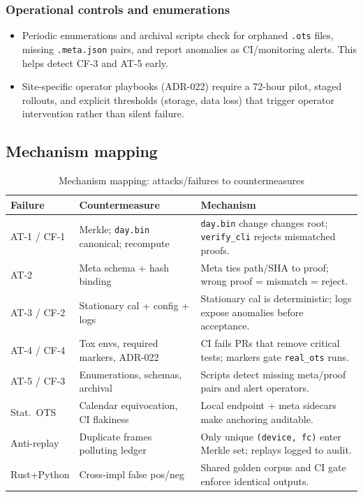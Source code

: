 \subsubsection{Operational controls and enumerations}
\begin{itemize}[nosep]
  \item Periodic enumerations and archival scripts check for orphaned \texttt{.ots} files, missing \texttt{.meta.json} pairs, and report anomalies as \ac{CI}/monitoring alerts.
  This helps detect CF-3 and AT-5 early.
  \item Site-specific operator playbooks (\ac{ADR}-022) require a 72-hour pilot, staged rollouts, and explicit thresholds (storage, data loss) that trigger operator intervention rather than silent failure.
\end{itemize}

\subsection{Mechanism mapping}
\begin{table}[H]
  \centering
  \caption{Mechanism mapping: attacks/failures to countermeasures}
  \begin{tabularx}{\textwidth}{l >{\raggedright\arraybackslash}X >{\raggedright\arraybackslash}X}
    \toprule
    \textbf{Failure} & \textbf{Countermeasure} & \textbf{Mechanism} \\
    \midrule
    AT-1 / CF-1 & Merkle; \texttt{day.bin} canonical; recompute & \texttt{day.bin} change changes root; \texttt{verify\_cli} rejects mismatched proofs. \\
    \addlinespace
    AT-2 & Meta schema + hash binding & Meta ties path/\ac{SHA} to proof; wrong proof = mismatch = reject. \\
    \addlinespace
    AT-3 / CF-2 & Stationary cal + config + logs & Stationary cal is deterministic; logs expose anomalies before acceptance. \\
    \addlinespace
    AT-4 / CF-4 & Tox envs, required markers, \ac{ADR}-022 & \ac{CI} fails PRs that remove critical tests; markers gate \texttt{real\_ots} runs. \\
    \addlinespace
    AT-5 / CF-3 & Enumerations, schemas, archival & Scripts detect missing meta/proof pairs and alert operators. \\
    \addlinespace
    Stat.\ \ac{OTS} & Calendar equivocation, \ac{CI} flakiness & Local endpoint + meta sidecars make anchoring auditable. \\
    \addlinespace
    Anti-replay & Duplicate frames polluting ledger & Only unique \texttt{(device, fc)} enter Merkle set; replays logged to audit. \\
    \addlinespace
    Rust+Python & Cross-impl false pos/neg & Shared golden corpus and \ac{CI} gate enforce identical outputs. \\
    \bottomrule
  \end{tabularx}
\end{table}

